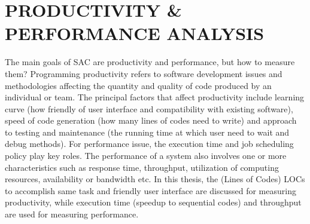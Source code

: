 %
%
%


\chapter{\uppercase {Productivity \& Performance Analysis}}
The main goals of SAC are productivity and performance, but how to measure them? Programming productivity \cite{ProgramProductWiki} refers to software development issues and methodologies affecting the quantity and quality of code produced by an individual or team. The principal factors that affect productivity include learning curve (how friendly of user interface and compatibility with existing software), speed of code generation (how many lines of codes need to write) and approach to testing and maintenance (the running time at which user need to wait and debug methods). For performance issue, the execution time and job scheduling policy play key roles. The performance of a system also involves one or more characteristics such as response time, throughput, utilization of computing resources, availability or bandwidth etc. In this thesis, the (Lines of Codes) LOCs to accomplish same task and friendly user interface are discussed for measuring productivity, while execution time (speedup to sequential codes) and throughput are used for measuring performance.  

